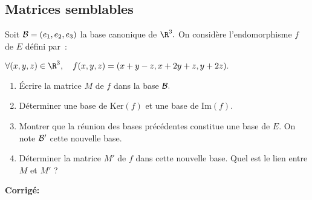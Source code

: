 \documentclass[a4paper,twoside,french,11pt]{VcCours}
\newcommand{\corr}{\textbf{Corrigé:}}
\begin{document}
\subsection{\large Matrices semblables}




\begin{Exercice}{} Soit ${\cal B}=(e_1,e_2,e_3)$ la base canonique de $\R^3.$ On considère
l'endomorphisme $f$ de $E$ défini par~:

\begin{center}
$\forall (x,y,z)\in\R^3,\quad f(x,y,z)=(x+y-z,x+2y+z,y+2z).$
\end{center}

\begin{enumerate}

\item Écrire la matrice $M$ de $f$ dans la base ${\cal B}.$

\item Déterminer une base de $\textrm{Ker}(f)$ et une base de $\textrm{Im}(f)$.

\item Montrer que la réunion des bases précédentes constitue une base de $E$. On note ${\cal B}'$ cette nouvelle base.

\item  Déterminer la matrice $M'$ de $f$ dans cette nouvelle base. Quel est le lien entre $M$ et $M'$ ?
\end{enumerate}

\end{Exercice}

\corr 
\end{document}
